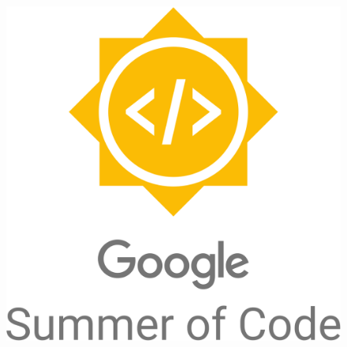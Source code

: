 \begin{figure}[!h]
\begin{minipage}{\textwidth}
     \includegraphics[width=.20\textwidth]{figures/GSoC_logo.svg.png}
    \end{minipage}
   \label{fig:funding_logos}
\end{figure}
   


